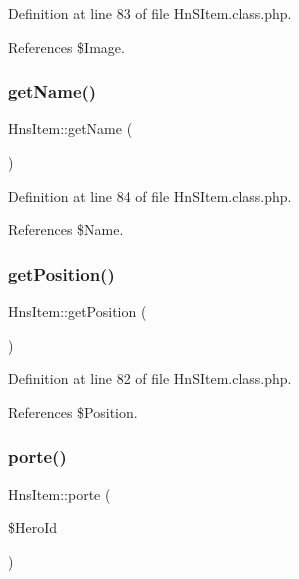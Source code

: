 Definition at line 83 of file Hn\+S\+Item.\+class.\+php.



References \$\+Image.

\mbox{\label{class_hns_item_a38f677cc34448a5ae5abfb8d9ddd4b5d}} 
\subsubsection{\texorpdfstring{get\+Name()}{getName()}}
{\footnotesize\ttfamily Hns\+Item\+::get\+Name (\begin{DoxyParamCaption}{ }\end{DoxyParamCaption})}



Definition at line 84 of file Hn\+S\+Item.\+class.\+php.



References \$\+Name.

\mbox{\label{class_hns_item_a89770f3d67b80293567f73c97956a8c5}} 
\subsubsection{\texorpdfstring{get\+Position()}{getPosition()}}
{\footnotesize\ttfamily Hns\+Item\+::get\+Position (\begin{DoxyParamCaption}{ }\end{DoxyParamCaption})}



Definition at line 82 of file Hn\+S\+Item.\+class.\+php.



References \$\+Position.

\mbox{\label{class_hns_item_a19379c2ae82def5cdf755944d8074493}} 
\subsubsection{\texorpdfstring{porte()}{porte()}}
{\footnotesize\ttfamily Hns\+Item\+::porte (\begin{DoxyParamCaption}\item[{}]{\$\+Hero\+Id }\end{DoxyParamCaption})\hspace{0.3cm}{\ttfamily [private]}}



